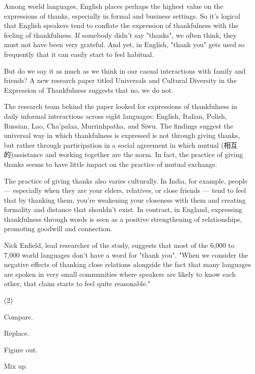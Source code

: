 \documentclass{英语试卷}
\begin{document}
\par Among world languages, English places perhaps the highest value on the expressions of thanks, especially in formal and business settings. So it's logical that English speakers tend to conflate the expression of thankfulness with the feeling of thankfulness. If somebody didn't say "thanks", we often think, they must not have been very grateful. And yet, in English, "thank you" gets used so frequently that it can easily start to feel habitual.\par
\par But do we say it as much as we think in our casual interactions with family and friends? A new research paper titled Universals and Cultural Diversity in the Expression of Thankfulness suggests that no, we do not.\par
\par The research team behind the paper looked for expressions of thankfulness in daily informal interactions across eight languages: English, Italian, Polish, Russian, Lao, Cha'palaa, Murrinhpatha, and Siwu. The findings suggest the universal way in which thankfulness is expressed is not through giving thanks, but rather through participation in a social agreement in which mutual (相互的)assistance and working together are the norm. In fact, the practice of giving thanks seems to have little impact on the practice of mutual exchange.\par
\par The practice of giving thanks also varies culturally. In India, for example, people — especially when they are your elders, relatives, or close friends — tend to feel that by thanking them, you're weakening your closeness with them and creating formality and distance that shouldn't exist. In contrast, in England, expressing thankfulness through words is seen as a positive strengthening of relationships, promoting goodwill and connection.\par
\par Nick Enfield, lead researcher of the study, suggests that most of the 6,000 to 7,000 world languages don't have a word for "thank you". "When we consider the negative effects of thanking close relations alongside the fact that many languages are spoken in very small communities where speakers are likely to know each other, that claim starts to feel quite reasonable."\par
{}
\begin{choices}(2)
  \item Compare.
  \item Replace.
  \item Figure out.
  \item Mix up.
\end{choices}
\end{document}
